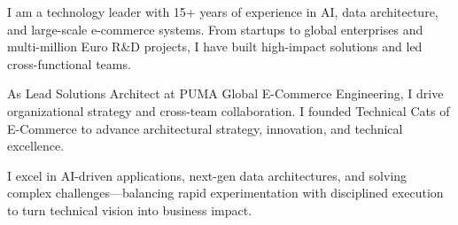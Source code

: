 \begin{cvparagraph}





I am a technology leader with 15+ years of experience in AI, data architecture, and large-scale e-commerce systems. From startups to global enterprises and multi-million Euro R\&D projects, I have built high-impact solutions and led cross-functional teams.

As Lead Solutions Architect at PUMA Global E-Commerce Engineering, I drive organizational strategy and cross-team collaboration. I founded Technical Cats of E-Commerce to advance architectural strategy, innovation, and technical excellence.

I excel in AI-driven applications, next-gen data architectures, and solving complex challenges—balancing rapid experimentation with disciplined execution to turn technical vision into business impact.





\end{cvparagraph}

